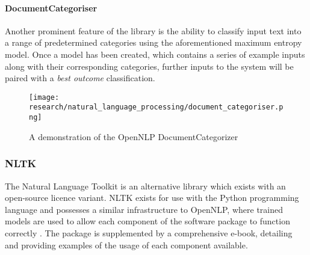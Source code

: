 \paragraph{DocumentCategoriser}

Another prominent feature of the library is the ability to classify input text into a range of predetermined categories using the aforementioned maximum entropy model. Once a model has been created, which contains a series of example inputs along with their corresponding categories, further inputs to the system will be paired with a \emph{best outcome} classification.

\begin{figure}[!ht]
	\texttt{[image: research/natural\_language\_processing/document\_categoriser.png]}
	\caption{A demonstration of the OpenNLP DocumentCategorizer}
\end{figure}

\subsubsection{NLTK}

The Natural Language Toolkit is an alternative library which exists with an open-source licence variant. NLTK exists for use with the Python programming language and possesses a similar infrastructure to OpenNLP, where trained models are used to allow each component of the software package to function correctly \citep{nltkproject12}. The package is supplemented by a comprehensive e-book, detailing and providing examples of the usage of each component available.